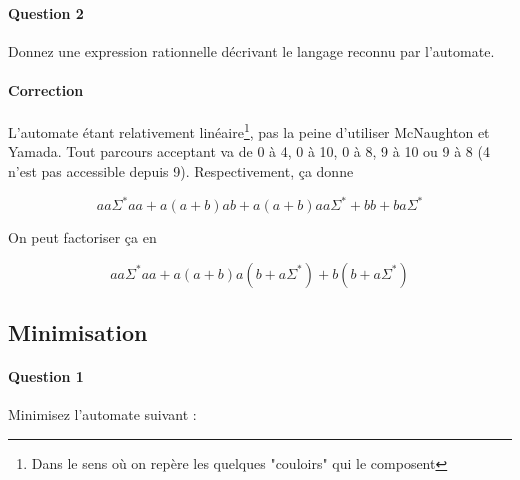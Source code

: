 \documentclass{article}[11pt]
\theoremstyle{definition}
\begin{document}
\paragraph{Question 2} Donnez une expression rationnelle décrivant le langage reconnu par l'automate.

\paragraph{Correction} L'automate étant relativement linéaire\footnote{Dans le sens où on repère les quelques "couloirs" qui le composent}, pas la peine d'utiliser McNaughton et Yamada. Tout parcours acceptant va de 0 à 4, 0 à 10, 0 à 8, 9 à 10 ou 9 à 8 (4 n'est pas accessible depuis 9). Respectivement, ça donne 

\[
aa\Sigma^*aa + a(a+b)ab + a(a+b)aa\Sigma^* + bb + ba\Sigma^* 
\]

On peut factoriser ça en 

\[
aa\Sigma^*aa + a(a+b)a(b+a\Sigma^*) + b(b + a\Sigma^*)
\]

\subsection{Minimisation}

\paragraph{Question 1} Minimisez l'automate suivant :
\end{document}
